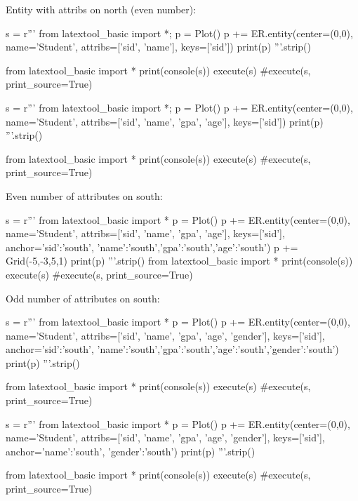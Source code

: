 \newpage
Entity with attribs on north (even number):
\begin{python}
s = r'''
from latextool_basic import *; p = Plot()
p += ER.entity(center=(0,0),
          name='Student',
          attribs=['sid', 'name'], keys=['sid'])
print(p)
'''.strip()

from latextool_basic import *
print(console(s))
execute(s)
#execute(s, print_source=True)
\end{python}
\begin{python}
s = r'''
from latextool_basic import *; p = Plot()
p += ER.entity(center=(0,0),
          name='Student',
          attribs=['sid', 'name', 'gpa', 'age'], keys=['sid'])
print(p)
'''.strip()

from latextool_basic import *
print(console(s))
execute(s)
#execute(s, print_source=True)
\end{python}



\newpage
Even number of attributes on south:
\begin{python}
s = r'''
from latextool_basic import *
p = Plot()
p += ER.entity(center=(0,0),
          name='Student',
          attribs=['sid', 'name', 'gpa', 'age'],
          keys=['sid'],
          anchor={'sid':'south', 'name':'south','gpa':'south','age':'south'})
p += Grid(-5,-3,5,1)
print(p)
'''.strip()
from latextool_basic import *
print(console(s))
execute(s)
#execute(s, print_source=True)
\end{python}

Odd number of attributes on south:
\begin{python}
s = r'''
from latextool_basic import *
p = Plot()
p += ER.entity(center=(0,0),
          name='Student',
          attribs=['sid', 'name', 'gpa', 'age', 'gender'],
          keys=['sid'],
          anchor={'sid':'south', 'name':'south','gpa':'south','age':'south','gender':'south'})
print(p)
'''.strip()

from latextool_basic import *
print(console(s))
execute(s)
#execute(s, print_source=True)
\end{python}




\begin{python}
s = r'''
from latextool_basic import *
p = Plot()
p += ER.entity(center=(0,0),
          name='Student',
          attribs=['sid', 'name', 'gpa', 'age', 'gender'],
          keys=['sid'],
          anchor={'name':'south', 'gender':'south'})
print(p)
'''.strip()

from latextool_basic import *
print(console(s))
execute(s)
#execute(s, print_source=True)
\end{python}


